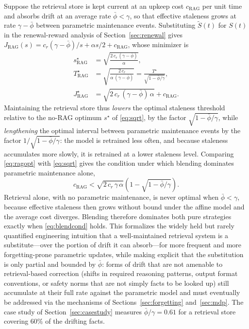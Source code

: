 \documentclass[electronics,article,submit,pdftex,moreauthors]{Definitions/mdpi}
\newcommand{\phibar}{\bar{\phi}}
\newcommand{\cRAG}{c_{\mathrm{RAG}}}
\begin{document}
Suppose the retrieval store is kept current at an upkeep cost $\cRAG$ per unit time and absorbs drift at an average rate $\phibar<\gamma$, so that effective staleness grows at rate $\gamma-\phibar$ between parametric maintenance events. Substituting $\tilde{S}(t)$ for $S(t)$ in the renewal-reward analysis of Section~\ref{sec:renewal} gives $J_{\mathrm{RAG}}(s)=c_r(\gamma-\phibar)/s+\alpha s/2+\cRAG$, whose minimizer is
\begin{equation}\label{eq:ragopt}
\begin{aligned}
s^\star_{\mathrm{RAG}}&=\sqrt{\frac{2\,c_r\,(\gamma-\phibar)}{\alpha}},\\
T^\star_{\mathrm{RAG}}&=\sqrt{\frac{2\,c_r}{\alpha\,(\gamma-\phibar)}}=\frac{T^\star}{\sqrt{1-\phibar/\gamma}},\\
J^\star_{\mathrm{RAG}}&=\sqrt{2\,c_r\,(\gamma-\phibar)\,\alpha}+\cRAG.
\end{aligned}
\end{equation}
Maintaining the retrieval store thus \textit{lowers} the optimal staleness threshold relative to the no-RAG optimum $s^\star$ of \eqref{eq:sqrt}, by the factor $\sqrt{1-\phibar/\gamma}$, while \textit{lengthening} the optimal interval between parametric maintenance events by the factor $1/\sqrt{1-\phibar/\gamma}$: the model is retrained less often, and because staleness accumulates more slowly, it is retrained at a lower staleness level. Comparing \eqref{eq:ragopt} with \eqref{eq:sqrt} gives the condition under which blending dominates parametric maintenance alone,
\begin{equation}\label{eq:blendcond}
\cRAG<\sqrt{2\,c_r\,\gamma\,\alpha}\left(1-\sqrt{1-\phibar/\gamma}\right).
\end{equation}
Retrieval alone, with no parametric maintenance, is never optimal when $\phibar<\gamma$, because effective staleness then grows without bound under the affine model and the average cost diverges. Blending therefore dominates both pure strategies exactly when \eqref{eq:blendcond} holds. This formalizes the widely held but rarely quantified engineering intuition that a well-maintained retrieval system is a substitute---over the portion of drift it can absorb---for more frequent and more forgetting-prone parametric updates, while making explicit that the substitution is only partial and bounded by $\phibar$: forms of drift that are not amenable to retrieval-based correction (shifts in required reasoning patterns, output format conventions, or safety norms that are not simply facts to be looked up) still accumulate at their full rate against the parametric model and must eventually be addressed via the mechanisms of Sections~\ref{sec:forgetting} and~\ref{sec:mdp}. The case study of Section~\ref{sec:casestudy} measures $\phibar/\gamma=0.61$ for a retrieval store covering 60\% of the drifting facts.
\end{document}
